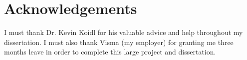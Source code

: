 \chapter*{Acknowledgements}
I must thank Dr. Kevin Koidl for his valuable advice and
help throughout my dissertation.  I must also thank Visma (my
employer) for granting me three months leave in order to complete
this large project and dissertation.